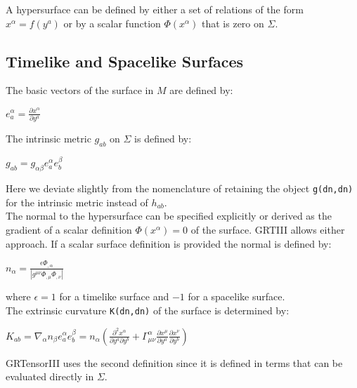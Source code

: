 \documentclass{article}
\begin{document}
A hypersurface can be defined by either a set of relations of the form $x^\alpha = f(y^a)$ or by a scalar function $\Phi(x^\alpha)$ that is zero on 
$\Sigma$. \\

\subsection{Timelike and Spacelike Surfaces}

The basic vectors of the surface in $M$ are defined by:
\begin{center}
$e^{\alpha}_{a} = \frac{\partial x^{\alpha}}{\partial y^a}$
\end{center}


The intrinsic metric $g_{a b}$ on $\Sigma$ is defined by:
\begin{center}
$g_{a b} = g_{\alpha \beta} e^{\alpha}_a e^{\beta}_b$
\end{center}
Here we deviate slightly from the nomenclature of \cite{poisson:2004} retaining the object \texttt{g(dn,dn)} for the intrinsic metric instead of $h_{a b}$. \\

The normal to the hypersurface can be specified explicitly or derived as the gradient of a scalar definition $\Phi(x^\alpha) = 0$ of the surface. GRTIII 
allows either approach. If a scalar surface definition is provided the normal is defined by:
\begin{center}
$n_\alpha = \frac{\epsilon \Phi_{,\alpha}}{\left| g^{\mu \nu} \Phi_{,\mu} \Phi_{,\nu} \right|}$
\end{center}
where $\epsilon=1$ for a timelike surface and $-1$ for a spacelike surface. \\

The extrinsic curvature \texttt{K(dn,dn)} of the surface is determined by:
\begin{center}
$K_{a b} = \nabla_\alpha n_\beta e^\alpha_a e^\beta_b = n_\alpha \left( \frac{\partial^2 x^\alpha}{\partial y^a \partial y^b}
+ \Gamma^\alpha_{\mu \nu} \frac{\partial x^{\mu}}{\partial y^a} \frac{\partial x^{\nu}}{\partial y^b} \right)$
\end{center}
GRTensorIII uses the second definition since it is defined in terms that can be evaluated directly in $\Sigma$.
\end{document}
